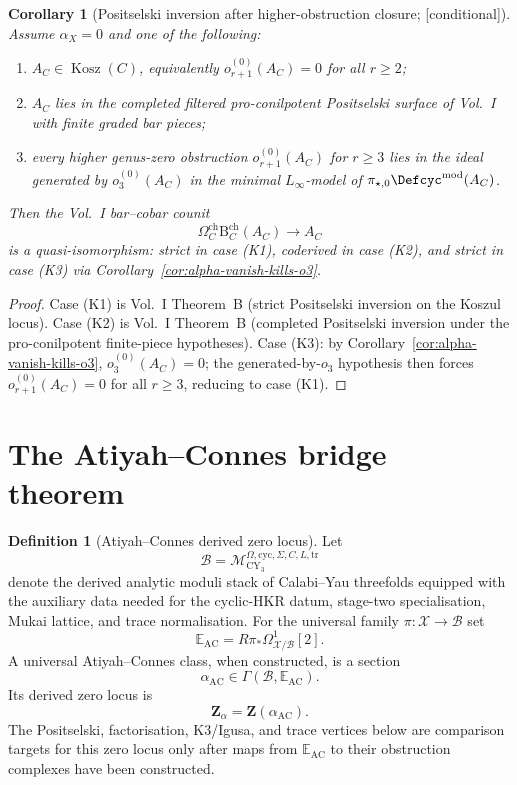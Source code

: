 \documentclass[11pt,reqno]{amsart}
\theoremstyle{plain}
\newtheorem{corollary}[theorem]{Corollary}
\theoremstyle{definition}
\newtheorem{definition}[theorem]{Definition}
\theoremstyle{remark}
\providecommand{\ClaimStatusConditional}{\textnormal{[conditional]}}
\newcommand{\Bar}{\mathrm{B}}
\newcommand{\Cobar}{\Omega}
\begin{document}
\begin{corollary}[Positselski inversion after higher-obstruction closure; \ClaimStatusConditional]
\label{cor:sp-alpha-positselski}
Assume $\alpha_X=0$ and one of the following:
\begin{enumerate}[label=\textup{(K\arabic*)}]
  \item $A_C\in\operatorname{Kosz}(C)$, equivalently
  $o^{(0)}_{r+1}(A_C)=0$ for all $r\geq 2$;
  \item $A_C$ lies in the completed filtered pro-conilpotent
  Positselski surface of Vol.~I with finite graded bar pieces;
  \item every higher genus-zero obstruction $o^{(0)}_{r+1}(A_C)$ for
  $r\geq 3$ lies in the ideal generated by $o^{(0)}_3(A_C)$ in the
  minimal $L_\infty$-model of $\pi_{\star,0}\Defcyc^{\mathrm{mod}}(A_C)$.
\end{enumerate}
Then the Vol.~I bar--cobar counit
\[
  \Cobar_C^{\mathrm{ch}}\Bar_C^{\mathrm{ch}}(A_C)\to A_C
\]
is a quasi-isomorphism: strict in case \textup{(K1)}, coderived in
case \textup{(K2)}, and strict in case \textup{(K3)} via
Corollary~\ref{cor:alpha-vanish-kills-o3}.
\end{corollary}

\begin{proof}
Case \textup{(K1)} is Vol.~I Theorem~B (strict Positselski inversion
on the Koszul locus). Case \textup{(K2)} is Vol.~I Theorem~B
(completed Positselski inversion under the pro-conilpotent
finite-piece hypotheses). Case \textup{(K3)}: by
Corollary~\ref{cor:alpha-vanish-kills-o3}, $o^{(0)}_3(A_C)=0$; the
generated-by-$o_3$ hypothesis then forces $o^{(0)}_{r+1}(A_C)=0$ for
all $r\geq 3$, reducing to case \textup{(K1)}.
\end{proof}

\section{The Atiyah--Connes bridge theorem}
\label{sec:main}

\begin{definition}[Atiyah--Connes derived zero locus]
\label{def:atiyah-connes-zero-locus}
Let
\[
  \mathcal B=
  \mathcal M^{\Omega,\mathrm{cyc},\Sigma,C,L,\mathrm{tr}}_{\mathrm{CY}_3}
\]
denote the derived analytic moduli stack of Calabi--Yau threefolds
equipped with the auxiliary data needed for the cyclic-HKR datum,
stage-two specialisation, Mukai lattice, and trace normalisation. For
the universal family $\pi:\mathcal X\to\mathcal B$ set
\[
  \mathbb E_{\mathrm{AC}}=R\pi_*\Omega^1_{\mathcal X/\mathcal B}[2].
\]
A universal Atiyah--Connes class, when constructed, is a section
\[
  \alpha_{\mathrm{AC}}\in \Gamma(\mathcal B,\mathbb E_{\mathrm{AC}}).
\]
Its derived zero locus is
\[
  \mathbf Z_\alpha=\mathbf Z(\alpha_{\mathrm{AC}}).
\]
The Positselski, factorisation, K3/Igusa, and trace vertices below are
comparison targets for this zero locus only after maps from
$\mathbb E_{\mathrm{AC}}$ to their obstruction complexes have been
constructed.
\end{definition}
\end{document}

